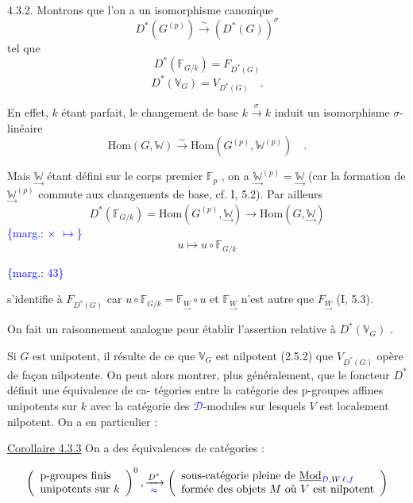 \documentclass[11pt]{article}
\newcommand{\scanpage}[1]{\par\bigskip\noindent{\small\sffamily[scan #1]}\par}
\newcommand{\mspage}[1]{{\small\sffamily[p.\,#1]}}
\newcommand{\hand}[1]{\textcolor{blue}{#1}}
\newcommand{\margin}[1]{\textcolor{blue}{\{\textsf{marg.:} #1\}}}
\newcommand{\uline}[1]{\underline{#1}}
\newenvironment{diagramblock}{\par\begin{center}}{\end{center}\par}
\begin{document}
4.3.2. Montrons que l'on a un isomorphisme canonique
\[ D^*(G^{(p)}) \overset{\sim}{\rightarrow} (D^*(G))^{\sigma} \]
tel que
\[ D^*(\mathbb{F}_{G/k}) = F_{D^*(G)} \]
\[ D^*(\mathbb{V}_{G}) = V_{D^*(G)} \quad . \]

En effet, $k$ étant parfait, le changement de base $k \overset{\sigma}{\rightarrow} k$
induit un isomorphisme $\sigma$-linéaire
\[ \mathrm{Hom}(G, \mathbb{W}) \overset{\sim}{\rightarrow} \mathrm{Hom}(G^{(p)}, \mathbb{W}^{(p)}) \quad . \]

Mais $\underset{\rightarrow}{\mathbb{W}}$ étant défini sur le corps premier $\mathbb{F}_p$ , on a $\underset{\rightarrow}{\mathbb{W}}^{(p)} = \underset{\rightarrow}{\mathbb{W}}$
(car la formation de $\underset{\rightarrow}{\mathbb{W}}^{(p)}$ commute aux changements de base, cf. I, 5.2).
Par ailleurs
\[ D^*(\mathbb{F}_{G/k}) = \mathrm{Hom}(G^{(p)}, \underset{\rightarrow}{\mathbb{W}}) \rightarrow \mathrm{Hom}(G, \underset{\rightarrow}{\mathbb{W}}) \]
\margin{$\times$ \quad $\mapsto$}
\[ u \mapsto u \circ \mathbb{F}_{G/k} \]

\margin{43}

\clearpage
\scanpage{129/44}
\mspage{\hand{II.16}}

s'identifie à $F_{D^*(G)}$ car $u \circ \mathbb{F}_{G/k} = \mathbb{F}_{\underset{\rightarrow}{W}} \circ u$ et $\mathbb{F}_{\underset{\rightarrow}{W}}$ n'est autre que
$F_{\underset{\rightarrow}{W}}$ (I, 5.3).

On fait un raisonnement analogue pour établir l'assertion
relative à $D^*(\mathbb{V}_G)$ .

Si $G$ est unipotent, il résulte de ce que $\mathbb{V}_G$ est nilpotent
(2.5.2) que $V_{D^*(G)}$ opère de façon nilpotente. On peut alors montrer,
plus généralement, que le foncteur $D^*$ définit une équivalence de ca-%
tégories entre la catégorie des p-groupes affines unipotents sur $k$ avec
la catégorie des \hand{$\mathcal{D}$}-modules sur lesquels $V$ est localement nilpotent. On
a en particulier :

\uline{Corollaire 4.3.3} On a des équivalences de catégories :

\begin{diagramblock}\[
\left(\begin{array}{l} \text{p-groupes finis} \\ \text{unipotents sur } k \end{array}\right)^0 , \xrightarrow[\hand{\approx}]{D^*} \left(\begin{array}{l} \text{sous-catégorie pleine de } \underline{\mathrm{Mod}}_{\hand{\mathcal{D}},W\,\hand{\ell.f}} \\ \text{formée des objets } M \text{ où } V \text{ est nilpotent} \end{array}\right)
\]\end{diagramblock}
\end{document}
